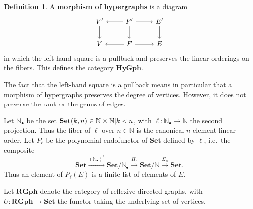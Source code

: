 \documentclass{article}
\theoremstyle{definition}
\newtheorem{defn}[thm]{Definition}
\theoremstyle{remark}
\let\setof\Set
\def\Set{\mathbf{Set}}
\newcommand{\dlpullback}[1][dl]{\ar[#1,phantom,near start,"\llcorner"]}
\let\xto\xrightarrow
\def\N{\mathbb{N}}
\def\Np{\N_{\bullet}}
\def\hy{\mathbf{HyGph}}
\def\RGph{\mathbf{RGph}}
\begin{document}
\begin{defn}
  A \textbf{morphism of hypergraphs} is a diagram
  \[
  \begin{tikzcd}
    V' \ar[d] & F' \ar[d] \ar[r] \ar[l] \dlpullback[dl] & E' \ar[d]\\
    V  & F \ar[r] \ar[l] & E
  \end{tikzcd}
  \]
  in which the left-hand square is a pullback and preserves the linear orderings on the fibers.
  This defines the category $\hy$.
\end{defn}

The fact that the left-hand square is a pullback means in particular that a morphism of hypergraphs preserves the degree of vertices.
However, it does not preserve the rank or the genus of edges.

Let $\Np$ be the set $\setof{(k,n) \in \N\times \N | k<n}$, with $\ell:\Np\to \N$ the second projection.
Thus the fiber of $\ell$ over $n\in\N$ is the canonical $n$-element linear order.
Let $P_\ell$ be the polynomial endofunctor of $\Set$ defined by $\ell$, i.e.\ the composite
\[ \Set \xto{(\Np)^*} \Set/\Np \xto{\Pi_\ell} \Set/\N \xto{\Sigma_\N} \Set.\]
Thus an element of $P_\ell(E)$ is a finite list of elements of $E$.

Let $\RGph$ denote the category of reflexive directed graphs, with $U:\RGph\to\Set$ the functor taking the underlying set of vertices.
\end{document}
